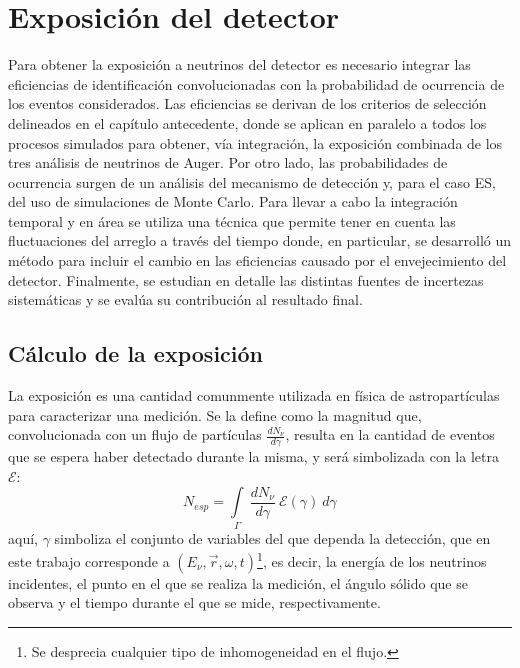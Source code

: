 \chapter{Exposici\'on del detector}
\label{ch:expAuger}

Para obtener la exposici\'on a neutrinos del detector es necesario integrar las eficiencias de identificaci\'on convolucionadas con la probabilidad de ocurrencia de los eventos considerados. Las eficiencias se derivan de los criterios de selecci\'on delineados en el cap\'itulo antecedente, donde se aplican en paralelo  a todos los procesos simulados para obtener, v\'ia integraci\'on, la exposici\'on combinada de los tres an\'alisis de neutrinos de Auger.
Por otro lado, las probabilidades de ocurrencia surgen de un an\'alisis del mecanismo de detecci\'on y, para el caso ES, del uso de simulaciones de Monte Carlo.
Para llevar a cabo la integraci\'on temporal y en \'area se utiliza una t\'ecnica que permite tener en cuenta las fluctuaciones del arreglo a trav\'es del tiempo donde, en particular, se desarroll\'o un m\'etodo para incluir el cambio en las eficiencias causado por el envejecimiento del detector.
Finalmente, se estudian en detalle las distintas fuentes de incertezas sistem\'aticas y se eval\'ua su contribuci\'on al resultado final.


\section{C\'alculo de la exposici\'on}
\label{sc:expoNu}
	
	La exposición es una cantidad comunmente utilizada en física de astropartículas para caracterizar una medición.
	Se la define como la magnitud que, convolucionada con un flujo de partículas $\frac{dN_{\nu}}{d\gamma}$, resulta en la cantidad de eventos que se espera haber detectado durante la misma, y ser\'a simbolizada con la letra $\mathscr{E}$:
	\begin{equation}
	 N_{esp}=\int\limits_{\Gamma}~\frac{dN_{\nu}}{d\gamma}~\mathscr{E}(\gamma) ~d\gamma
	 \label{eq:exp0}
	\end{equation}
	aqu\'i, $\gamma$ simboliza el conjunto de variables del que dependa la detección, que en este trabajo corresponde a $(E_{\nu},\vec{r},\omega,t)$\footnote{Se desprecia cualquier tipo de inhomogeneidad en el flujo.}, es decir, la energía de los neutrinos incidentes, el punto en el que se realiza la medici\'on, el ángulo sólido que se observa y el tiempo durante el que se mide, respectivamente.
	
